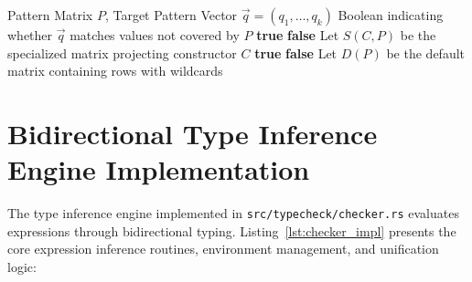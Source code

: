 \begin{algorithm}[h!]
\caption{Maranget Pattern Matrix Utility Algorithm}
\label{alg:maranget}
\begin{algorithmic}[1]
\Require Pattern Matrix $P$, Target Pattern Vector $\vec{q} = (q_1, \dots, q_k)$
\Ensure Boolean indicating whether $\vec{q}$ matches values not covered by $P$
     \State \Return \textbf{true} \EndIf
     \State \Return \textbf{false} \EndIf
        \State Let $S(C, P)$ be the specialized matrix projecting constructor $C$
        \State \Return {}
                    \State \Return \textbf{true}
                \EndIf
            \EndFor
            \State \Return \textbf{false}
        \Else
            \State Let $D(P)$ be the default matrix containing rows with wildcards
            \State \Return {}
        \EndIf
    \EndIf
\EndProcedure
\end{algorithmic}
\end{algorithm}

\section{Bidirectional Type Inference Engine Implementation}
\label{sec:types:checker_impl}

The type inference engine implemented in \texttt{src/typecheck/checker.rs} evaluates expressions through bidirectional typing. Listing~\ref{lst:checker_impl} presents the core expression inference routines, environment management, and unification logic:

